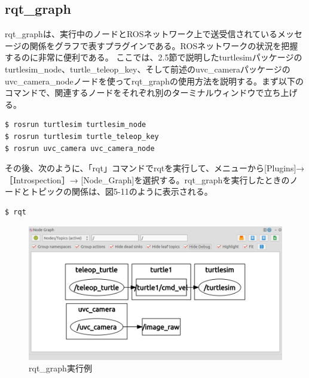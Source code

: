 \subsection{rqt\_graph}

rqt\_graphは、実行中のノードとROSネットワーク上で送受信されているメッセージの関係をグラフで表すプラグインである。ROSネットワークの状況を把握するのに非常に便利である。
ここでは、2.5節で説明したturtlesimパッケージのturtlesim\_node、turtle\_teleop\_key、そして前述のuvc\_cameraパッケージのuvc\_camera\_nodeノードを使ってrqt\_graphの使用方法を説明する。まず以下のコマンドで、関連するノードをそれぞれ別のターミナルウィンドウで立ち上げる。

\begin{lstlisting}[language=ROS]
$ rosrun turtlesim turtlesim_node
$ rosrun turtlesim turtle_teleop_key
$ rosrun uvc_camera uvc_camera_node
\end{lstlisting}

その後、次のように、「rqt」コマンドでrqtを実行して、メニューから[Plugins]→［Introspection］→ [Node\_Graph]を選択する。rqt\_graphを実行したときのノードとトピックの関係は、図5-11のように表示される。

\begin{lstlisting}[language=ROS]
$ rqt
\end{lstlisting}

\begin{figure}[h]
  \centering
  \includegraphics[width=\columnwidth]{pictures/chapter5/pic_05_11.png}
  \caption{rqt_graph実行例}
\end{figure}

